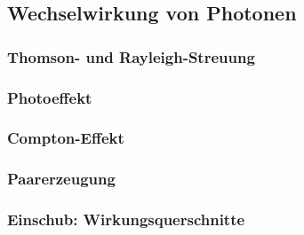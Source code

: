 \documentclass{article}
\begin{document}
\graphicspath{{bilder/1-2/}}
	\subsection{Wechselwirkung von Photonen}
		
			\subsubsection{Thomson- und Rayleigh-Streuung}
				
			\subsubsection{Photoeffekt}
				 
			\subsubsection{Compton-Effekt}
				
			\subsubsection{Paarerzeugung}
				
			\subsubsection*{Einschub: Wirkungsquerschnitte}
				
\end{document}
